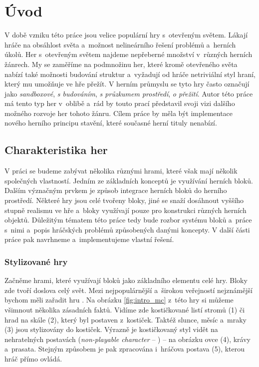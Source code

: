 
\chapter{Úvod}
\label{chap:uvod}

V době vzniku této práce jsou velice populární hry s~otevřeným světem. Lákají hráče na obsáhlost světa a~možnost nelineárního řešení problémů a~herních úkolů. Her s~otevřeným světem najdeme nepřeberné množství v~různých herních žánrech. My se zaměříme na podmnožinu her, které kromě otevřeného světa nabízí také možnosti budování struktur a~vyžadují od hráče netriviální styl hraní, který mu umožňuje ve hře přežít. V herním průmyslu se tyto hry často označují jako \textit{sandboxové}, \textit{s budováním}, \textit{s průzkumem prostředí}, \textit{o přežití}. Autor této práce má tento typ her v~oblibě a~rád by touto prací představil svoji vizi dalšího možného rozvoje her tohoto žánru. Cílem práce by měla být implementace nového herního principu stavění, které současné herní tituly nenabízí.

\section{Charakteristika her}
V práci se budeme zabývat několika různými hrami, které však mají několik společných vlastností. Jedním ze základních konceptů je využívání herních bloků. Dalším význačným prvkem je způsob integrace herních bloků do herního prostředí. Některé hry jsou celé tvořeny bloky, jiné se snaží dosáhnout vyššího stupně realismu ve hře a~bloky využívají pouze pro konstrukci různých herních objektů. Důležitým tématem této práce tedy bude rozbor systému bloků a~práce s~nimi a~popis hráčských problémů způsobených danými koncepty. V další části práce pak navrhneme a~implementujeme vlastní řešení.




\subsection{Stylizované hry}
Začněme hrami, které využívají bloků jako základního elementu celé hry. Bloky zde tvoří doslova celý svět. Mezi nejpopulárnější a~širokou veřejností nejznámější bychom měli zařadit hru \MC{}. Na obrázku \ref{fig:intro_mc} z~této hry si můžeme všimnout několika zásadních faktů. Vidíme zde kostičkované listí stromů (1) či hrad na skále (2), který byl postaven z~kostiček. Taktéž slunce, měsíc a~mraky (3) jsou stylizovány do kostiček. Výrazně je kostičkovaný styl vidět na nehratelných postavách (\textit{non-playable character} -- \NPC{}) -- na obrázku ovce (4), krávy a~prasata. Stejným způsobem je pak zpracována i~hráčova postava (5), kterou hráč přímo ovládá.

